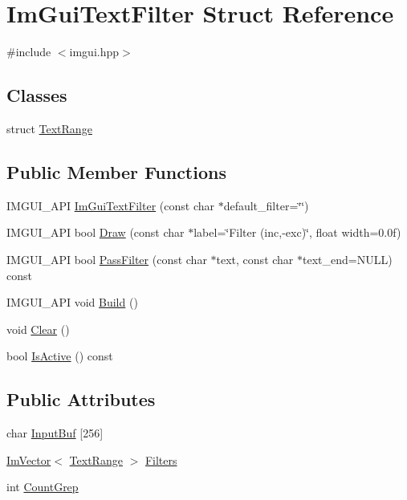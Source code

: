 \hypertarget{struct_im_gui_text_filter}{}\section{Im\+Gui\+Text\+Filter Struct Reference}
\label{struct_im_gui_text_filter}


{\ttfamily \#include $<$imgui.\+hpp$>$}

\subsection*{Classes}
\begin{DoxyCompactItemize}
\item 
struct \hyperlink{struct_im_gui_text_filter_1_1_text_range}{Text\+Range}
\end{DoxyCompactItemize}
\subsection*{Public Member Functions}
\begin{DoxyCompactItemize}
\item 
I\+M\+G\+U\+I\+\_\+\+A\+PI \hyperlink{struct_im_gui_text_filter_a0a61ee76f0b4f3c354791734b06e3140}{Im\+Gui\+Text\+Filter} (const char $\ast$default\+\_\+filter=\char`\"{}\char`\"{})
\item 
I\+M\+G\+U\+I\+\_\+\+A\+PI bool \hyperlink{struct_im_gui_text_filter_ab93ad5985019ff9d3781606551fc26cc}{Draw} (const char $\ast$label=\char`\"{}Filter (inc,-\/exc)\char`\"{}, float width=0.\+0f)
\item 
I\+M\+G\+U\+I\+\_\+\+A\+PI bool \hyperlink{struct_im_gui_text_filter_a88d73ff8b81fbbd0a129b1bf3498d8aa}{Pass\+Filter} (const char $\ast$text, const char $\ast$text\+\_\+end=N\+U\+LL) const
\item 
I\+M\+G\+U\+I\+\_\+\+A\+PI void \hyperlink{struct_im_gui_text_filter_aef362baafaa9dfa62d11bc6101c0f4c1}{Build} ()
\item 
void \hyperlink{struct_im_gui_text_filter_a9043c1f0c33d29e6fc9b75ae81f9705a}{Clear} ()
\item 
bool \hyperlink{struct_im_gui_text_filter_a493158f2ab8f45fcf303c3f953be9b88}{Is\+Active} () const
\end{DoxyCompactItemize}
\subsection*{Public Attributes}
\begin{DoxyCompactItemize}
\item 
char \hyperlink{struct_im_gui_text_filter_ad070acb1038199dd4e8f5d010c5cb5ba}{Input\+Buf} \mbox{[}256\mbox{]}
\item 
\hyperlink{class_im_vector}{Im\+Vector}$<$ \hyperlink{struct_im_gui_text_filter_1_1_text_range}{Text\+Range} $>$ \hyperlink{struct_im_gui_text_filter_a5a930a339a9384e6bfadfa56a7c111fd}{Filters}
\item 
int \hyperlink{struct_im_gui_text_filter_ac31839c319fe4211c21fc143b7249f86}{Count\+Grep}
\end{DoxyCompactItemize}


